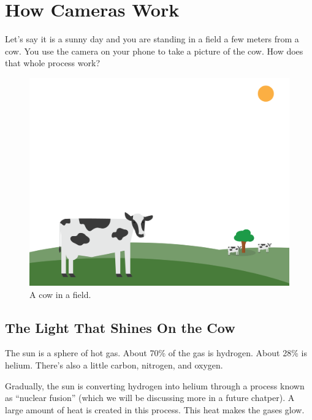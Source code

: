 \chapter{How Cameras Work}

Let's say it is a sunny day and you are standing in a field a few meters
from a cow. You use the camera on your phone to take a picture of the
cow. How does that whole process work?
\begin{figure}[htbp]
    \centering
    \includegraphics[width=1\textwidth]{cow1.png}
    \caption{A cow in a field.}
    \label{fig:cow1}
\end{figure}


\section{The Light That Shines On the Cow}

The sun is a sphere of hot gas. About 70\% of the gas is
hydrogen. About 28\% is helium. There's also a little carbon, nitrogen,
and oxygen.

Gradually, the sun is converting hydrogen into helium through a
process known as ``nuclear fusion'' (which we will be discussing more in a future chatper). A large amount of heat is created in this
process. This heat makes the gases glow.

